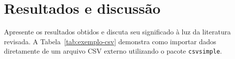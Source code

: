 \chapter{Resultados e discussão}
Apresente os resultados obtidos e discuta seu significado à luz da literatura revisada. A Tabela~\ref{tab:exemplo-csv} demonstra como importar dados diretamente de um arquivo CSV externo utilizando o pacote \texttt{csvsimple}.

\begin{table}[htbp]
  \centering
  \caption{Desempenho operacional importado de arquivo CSV}\label{tab:exemplo-csv}
\end{table}
